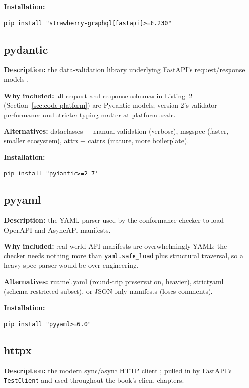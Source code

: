 \textbf{Installation:}
\begin{verbatim}
pip install "strawberry-graphql[fastapi]>=0.230"
\end{verbatim}

\subsection{pydantic}

\textbf{Description:} the data-validation library underlying FastAPI's
request/response models \cite{pydanticdocs}.

\textbf{Why included:} all request and response schemas in
Listing~2 (Section~\ref{sec:code-platform}) are Pydantic models; version 2's validator
performance and stricter typing matter at platform scale.

\textbf{Alternatives:} dataclasses + manual validation (verbose), msgspec
(faster, smaller ecosystem), attrs + cattrs (mature, more boilerplate).

\textbf{Installation:}
\begin{verbatim}
pip install "pydantic>=2.7"
\end{verbatim}

\subsection{pyyaml}

\textbf{Description:} the YAML parser used by the conformance checker to
load OpenAPI and AsyncAPI manifests.

\textbf{Why included:} real-world API manifests are overwhelmingly YAML;
the checker needs nothing more than \texttt{yaml.safe\_load} plus structural
traversal, so a heavy spec parser would be over-engineering.

\textbf{Alternatives:} ruamel.yaml (round-trip preservation, heavier),
strictyaml (schema-restricted subset), or JSON-only manifests (loses
comments).

\textbf{Installation:}
\begin{verbatim}
pip install "pyyaml>=6.0"
\end{verbatim}

\subsection{httpx}

\textbf{Description:} the modern sync/async HTTP client
\cite{httpxdocs}; pulled in by FastAPI's \texttt{TestClient} and used
throughout the book's client chapters.

